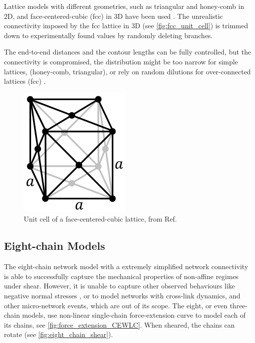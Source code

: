 Lattice models with different geometries, such as triangular and honey-comb in 2D, and face-centered-cubic (fcc) in 3D have been used \cite{broedersz_filament-length-controlled_2012,ronceray_fiber_2015, vahabi_elasticity_2016, sharma_strain-controlled_2016}. The unrealistic connectivity imposed by the fcc lattice in 3D (see \autoref{fig:fcc_unit_cell}) is trimmed down to experimentally found values by randomly deleting branches.

The end-to-end distances and the contour lengths can be fully controlled, but the connectivity is compromised, the distribution might be too narrow for simple lattices, (honey-comb, triangular), or rely on random dilutions for over-connected lattices (fcc) \cite{sharma_strain-controlled_2016}.

\begin{figure}[ht]
  \centering
  \includegraphics[width=0.3\linewidth]{Figures/chapter-intro/fcc_lattice_wiki.png}
  \caption{Unit cell of a face-centered-cubic lattice, from Ref. \cite{_cubic_2018}}
  \label{fig:fcc_unit_cell}
\end{figure}

\subsection{Eight-chain Models}%
\label{sub:eight_chain_models}

The eight-chain network model \cite{palmer_constitutive_2008, meng_nonlinear_2016} with a extremely simplified network connectivity is able to successfully capture the mechanical properties of non-affine regimes under shear. However, it is unable to capture other observed behaviours like negative normal stresses \cite{janmey_negative_2006}, or to model networks with cross-link dynamics, and other micro-network events, which are out of its scope.
The eight, or even three-chain models, use non-linear single-chain force-extension curve to model each of its chains, see \autoref{fig:force_extension_CEWLC}. When sheared, the chains can rotate (see \autoref{fig:eight_chain_shear}).

